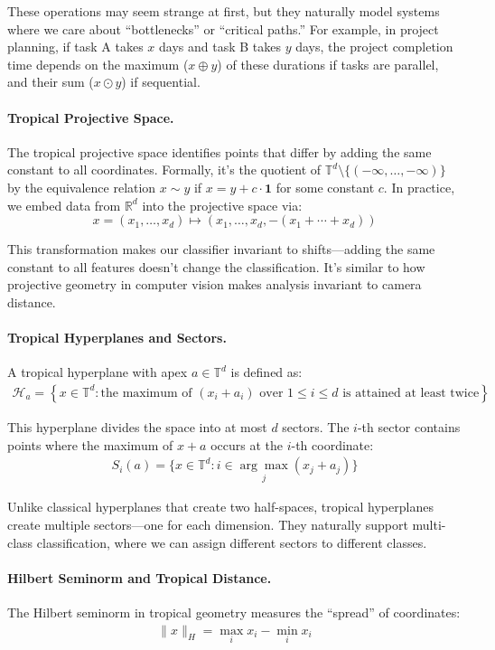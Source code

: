 \documentclass{article}
\newcommand{\R}{\mathbb{R}}
\newcommand{\trop}{\mathbb{T}}
\begin{document}
These operations may seem strange at first, but they naturally model systems where we care about ``bottlenecks'' or ``critical paths.'' For example, in project planning, if task A takes $x$ days and task B takes $y$ days, the project completion time depends on the maximum ($x \oplus y$) of these durations if tasks are parallel, and their sum ($x \odot y$) if sequential.

\paragraph{Tropical Projective Space.}  
The tropical projective space identifies points that differ by adding the same constant to all coordinates. Formally, it's the quotient of $\trop^d \setminus \{(-\infty,\dots,-\infty)\}$ by the equivalence relation $x \sim y$ if $x = y + c \cdot \mathbf{1}$ for some constant $c$. In practice, we embed data from $\R^d$ into the projective space via:
\[
x=(x_1,\dots,x_d)\mapsto (x_1,\dots,x_d,-(x_1+\cdots+x_d))
\]

This transformation makes our classifier invariant to shifts—adding the same constant to all features doesn't change the classification. It's similar to how projective geometry in computer vision makes analysis invariant to camera distance.

\paragraph{Tropical Hyperplanes and Sectors.}
A tropical hyperplane with apex $a \in \trop^d$ is defined as:
\begin{align}
\mathcal{H}_a = \left\{ x \in \trop^d : \text{the maximum of }(x_i + a_i)\text{ over $1\leq i\leq d$ is attained at least twice} \right\}
\end{align}

This hyperplane divides the space into at most $d$ sectors. The $i$-th sector contains points where the maximum of $x + a$ occurs at the $i$-th coordinate:
\begin{align}
S_i(a) = \{x \in \trop^d : i \in \underset{j}{\arg\max} (x_j + a_j)\}
\end{align}

Unlike classical hyperplanes that create two half-spaces, tropical hyperplanes create multiple sectors—one for each dimension. They naturally support multi-class classification, where we can assign different sectors to different classes.

\paragraph{Hilbert Seminorm and Tropical Distance.}
The Hilbert seminorm in tropical geometry measures the ``spread'' of coordinates:
\begin{align}
\|x\|_H = \max_i x_i - \min_i x_i
\end{align}
\end{document}
